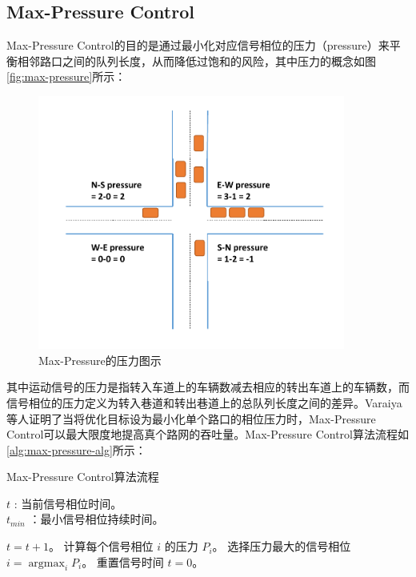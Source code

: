\subsection{Max-Pressure Control}
Max-Pressure Control\cite{varaiya2013max}的目的是通过最小化对应信号相位的压力（pressure）来平衡相邻路口之间的队列长度，从而降低过饱和的风险，其中压力的概念如图\autoref{fig:max-pressure}所示：
\begin{figure}[htb]
    \includegraphics[width=0.9\textwidth]{fig/max-pressure.pdf}
    \caption{Max-Pressure的压力图示}
    \label{fig:max-pressure}
\end{figure}
其中运动信号的压力是指转入车道上的车辆数减去相应的转出车道上的车辆数，而信号相位的压力定义为转入巷道和转出巷道上的总队列长度之间的差异。Varaiya\cite{varaiya2013max}等人证明了当将优化目标设为最小化单个路口的相位压力时，Max-Pressure Control可以最大限度地提高真个路网的吞吐量。Max-Pressure Control算法流程如\autoref{alg:max-pressure-alg}所示：
\begin{breakablealgorithm}
    \caption{Max-Pressure Control算法流程}
    \label{alg:max-pressure-alg}
    \begin{algorithmic}[1] %
        \Require 
        $t$ : 当前信号相位时间。\\
        $t_{min}$ ：最小信号相位持续时间。 

        \State $t = t+1$。
        \State 计算每个信号相位 $i$ 的压力 $P_i$。
        \State 选择压力最大的信号相位 $i=\mathop{\arg\max}_i{P_i}$。
        \State 重置信号时间 $t=0$。
        \EndIf
        \EndFor
    \end{algorithmic}  
\end{breakablealgorithm}  

